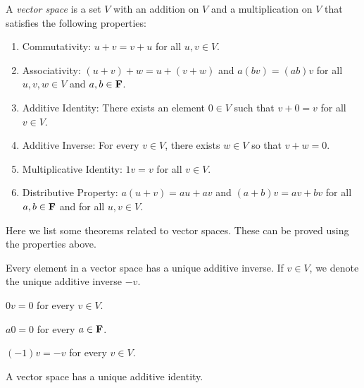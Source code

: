 \documentclass{article}
\begin{document}
\begin{definition}
  \label{def:vector-space}
  A \textit{vector space} is a set $V$ with an addition on $V$ and a multiplication on $V$ that satisfies the following properties:
  \begin{enumerate}
    \item Commutativity: $u + v = v + u$ for all $u, v \in V$.
    \item Associativity: $(u + v) + w = u + (v + w)$ and $a(bv) = (ab)v$ for all $u, v, w \in V$ and $a, b \in \bf{F}$.
    \item Additive Identity: There exists an element $0 \in V$ such that $v + 0 = v$ for all $v \in V$.
    \item Additive Inverse: For every $v \in V$, there exists $w \in V$ so that $v + w = 0$.
    \item Multiplicative Identity: $1v = v$ for all $v \in V$.
    \item Distributive Property: $a(u + v) = au + av$ and $(a + b)v = av + bv$ for all $a, b \in \bf{F}$ and for all $u, v \in V$.
  \end{enumerate}
  
\end{definition}

Here we list some theorems related to vector spaces. These can be proved using the properties above.

\begin{theorem}
  Every element in a vector space has a unique additive inverse. If $v \in V$, we denote the unique additive inverse $-v$.
\end{theorem}

\begin{theorem}
  $0v = 0$ for every $v \in V$.
\end{theorem}

\begin{theorem}
  $a0 = 0$ for every $a \in \bf{F}$.
\end{theorem}

\begin{theorem}
  $(-1)v = -v$ for every $v \in V$.
\end{theorem}

\begin{theorem}
  A vector space has a unique additive identity.
\end{theorem}
\end{document}
